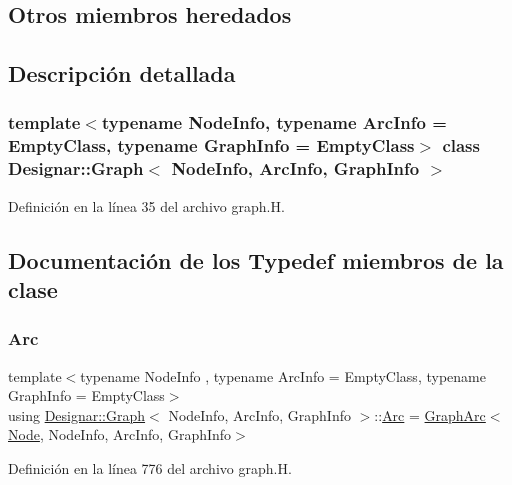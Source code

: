 \subsection*{Otros miembros heredados}


\subsection{Descripción detallada}
\subsubsection*{template$<$typename Node\+Info, typename Arc\+Info = Empty\+Class, typename Graph\+Info = Empty\+Class$>$\newline
class Designar\+::\+Graph$<$ Node\+Info, Arc\+Info, Graph\+Info $>$}



Definición en la línea 35 del archivo graph.\+H.



\subsection{Documentación de los \textquotesingle{}Typedef\textquotesingle{} miembros de la clase}
\mbox{\label{class_designar_1_1_graph_a74c730ef4ce2d20f998d72bd25c2b5bf}} 
\subsubsection{\texorpdfstring{Arc}{Arc}}
{\footnotesize\ttfamily template$<$typename Node\+Info , typename Arc\+Info  = Empty\+Class, typename Graph\+Info  = Empty\+Class$>$ \\
using \hyperlink{class_designar_1_1_graph}{Designar\+::\+Graph}$<$ Node\+Info, Arc\+Info, Graph\+Info $>$\+::\hyperlink{class_designar_1_1_graph_a74c730ef4ce2d20f998d72bd25c2b5bf}{Arc} =  \hyperlink{class_designar_1_1_graph_arc}{Graph\+Arc}$<$\hyperlink{class_designar_1_1_graph_a5dfc7dba9d092ac489c72e40390c37d0}{Node}, Node\+Info, Arc\+Info, Graph\+Info$>$}



Definición en la línea 776 del archivo graph.\+H.

\mbox{\label{class_designar_1_1_graph_abc2adb4841a6d092d5093f9e60f2c8be}} 
